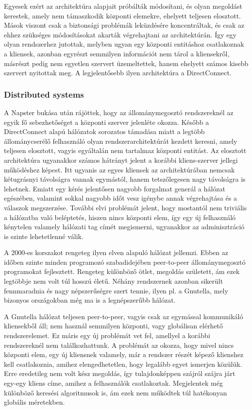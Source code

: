 \documentclass[a4paper]{article}
\begin{document}
Egyesek ezért az architektúra alapjait próbálták módosítani, és olyan megoldást kerestek, amely nem támaszkodik központi elemekre, ehelyett teljesen elosztott. Mások viszont csak a biztonsági problémák leküzdésére koncentráltak, és csak az ehhez szükséges módosításokat akarták végrehajtani az architektúrán. Így egy olyan rendszerhez jutottak, melyben ugyan egy központi entitáshoz csatlakoznak a kliensek, azonban egyrészt semmilyen információt nem tárol a kliensekről, másrészt pedig nem egyetlen szervert üzemeltettek, hanem ehelyett számos kisebb szervert nyitottak meg. A legjelentősebb ilyen architektúra a DirectConnect.

\subsubsection{Distributed systems}

A Napster bukása után rájöttek, hogy az állománymegosztó rendszereknél az egyik fő sebezhetőséget a központi szerver jelenléte okozza. Később a DirectConnect alapú hálózatok sorozatos támadása miatt a legtöbb állománycserélő felhasználó olyan rendszerarchitektúrát kezdett keresni, amely teljesen elosztott, vagyis egyáltalán nem tartalmaz központi entitást. Az elosztott architektúra ugyanakkor számos hátrányt jelent a korábbi kliens-szerver jellegi működéshez képest. Itt ugyanis az egyes kliensek az architektúrában nemcsak kétugrásnyi távolságra vannak egymástól, hanem tetszőlegesen nagy távolságra is lehetnek. Emiatt egy kérés jelentősen nagyobb forgalmat generál a hálózat egészében, valamint sokkal nagyobb időt vesz igénybe annak végrehajtása és a válaszok megszerzése. További elvi problémát jelent, hogy mostantól nem triviális a hálózatba való beléptetés, hiszen nincs központi elem, így egy új felhasználó kénytelen valamely hálózati tag címét megismerni, ugyanakkor az adminisztráció is szinte lehetetlenné válik.

A 2000-es korszakot rengeteg ilyen elven alapuló hálózat jellemzi. Ebben az időben szinte minden programozó szabadidejében peer-to-peer állománymegosztó programokat fejlesztett. Rengeteg különböző ötlet, megoldás született, ám ezek legtöbbje nem volt túl hosszú életű. Néhány rendszernek azonban sikerült fennmaradnia és nagy népszerűségre szert tennie, ilyen pl. a Gnutella, mely bizonyos országokban még ma is a legnépszerűbb hálózat.

A Gnutella hálózat teljesen peer-to-peer, vagyis csak az egymással kommunikáló kliensekből áll; nem használ semmilyen központi, vagy globálisan elérhető rendszerelemet. Ez máris egy új problémát vet fel, amellyel a korábbi rendszereknél nem találkozhattunk. A problémát az okozza, hogy mivel nincs központi elem, egy új kliensnek valamely, már a rendszer részét képező klienshez kell csatlakoznia, amihez elengedhetetlen, hogy legalább egyet ismerjen közülük. Erre eredetileg nem volt kész megoldás, így tulajdonképpen szájról szájra járt egy-egy kliens címe, amihez a felhasználók csatlakoztak. Megjelentek még különböző keresési algoritmusok is, ám ezek nem működtek túl hatékonyan globális méretekben.
\end{document}
